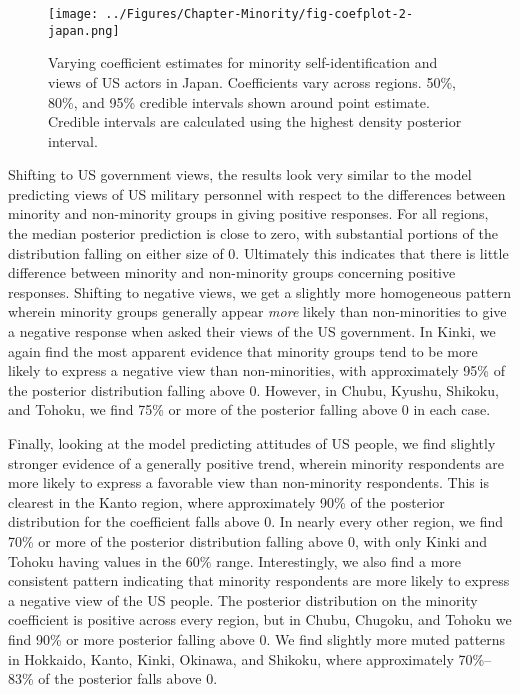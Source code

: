 \begin{figure}[t]
	\centering\texttt{[image: ../Figures/Chapter-Minority/fig-coefplot-2-japan.png]}
	\caption{Varying coefficient estimates for minority self-identification and views of US actors in Japan. Coefficients vary across regions. 50\%, 80\%, and 95\% credible intervals shown around point estimate. Credible intervals are calculated using the highest density posterior interval.}
	\label{fig:coefplot-japan}
\end{figure}

Shifting to US government views, the results look very similar to the model predicting views of US military personnel with respect to the differences between minority and non-minority groups in giving positive responses. For all regions, the median posterior prediction is close to zero, with substantial portions of the distribution falling on either size of 0. Ultimately this indicates that there is little difference between minority and non-minority groups concerning positive responses. Shifting to negative views, we get a slightly more homogeneous pattern wherein minority groups generally appear \textit{more} likely than non-minorities to give a negative response when asked their views of the US government. In Kinki, we again find the most apparent evidence that minority groups tend to be more likely to express a negative view than non-minorities, with approximately 95\% of the posterior distribution falling above 0. However, in Chubu, Kyushu, Shikoku, and Tohoku, we find 75\% or more of the posterior falling above 0 in each case.

Finally, looking at the model predicting attitudes of US people, we find slightly stronger evidence of a generally positive trend, wherein minority respondents are more likely to express a favorable view than non-minority respondents. This is clearest in the Kanto region, where approximately 90\% of the posterior distribution for the coefficient falls above 0. In nearly every other region, we find 70\% or more of the posterior distribution falling above 0, with only Kinki and Tohoku having values in the 60\% range. Interestingly, we also find a more consistent pattern indicating that minority respondents are more likely to express a negative view of the US people. The posterior distribution on the minority coefficient is positive across every region, but in Chubu, Chugoku, and Tohoku we find 90\% or more posterior falling above 0. We find slightly more muted patterns in Hokkaido, Kanto, Kinki, Okinawa, and Shikoku, where approximately 70\%--83\% of the posterior falls above 0.

